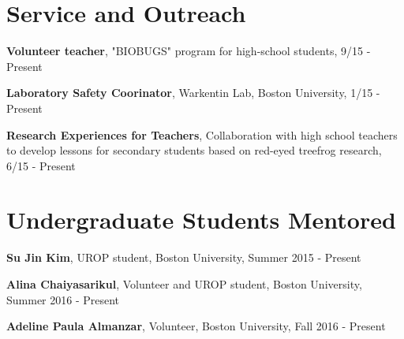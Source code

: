 \documentclass[margin,line]{res}
\begin{document}
\begin{resume}
\section{\sc Service and Outreach}

{\bf Volunteer teacher},  "BIOBUGS" program for high-school students, 9/15 - Present 

{\bf Laboratory Safety Coorinator},  Warkentin Lab, Boston University, 1/15 - Present 

{\bf Research Experiences for Teachers},  Collaboration with high school teachers to develop lessons for secondary students based on red-eyed treefrog research, 6/15 - Present

\section{\sc Undergraduate Students Mentored}
{\bf Su Jin Kim},  UROP student, Boston University, Summer 2015 - Present

{\bf Alina Chaiyasarikul}, Volunteer and UROP student, Boston University, Summer 2016 - Present

{\bf Adeline Paula Almanzar},  Volunteer, Boston University, Fall 2016 - Present


\end{resume}
\end{document}
